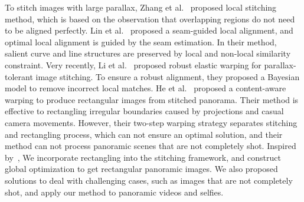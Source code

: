\documentclass[10pt,journal,compsoc]{IEEEtran}
\begin{document}
To stitch images with large parallax, Zhang et al.~\cite{conf/cvpr/ZhangL14a} proposed local stitching method, which is based on the observation that overlapping regions do not need to be aligned perfectly.
Lin et al.~\cite{conf/eccv/LinJCDL16} proposed a seam-guided local alignment, and optimal local alignment is guided by the seam estimation.
In their method, salient curve and line structures are preserved by local and non-local similarity constraint.
Very recently, Li et al.~\cite{journals/tmm/LiWLZZ18} proposed robust elastic warping for parallax-tolerant image stitching. To ensure a robust alignment, they proposed a Bayesian model to remove incorrect local matches.
He et al.~\cite{journals/tog/HeC013} proposed a content-aware warping to produce rectangular images from stitched panorama.  Their method is effective to rectangling irregular boundaries caused by projections and casual camera movements. However, their two-step warping strategy separates stitching and rectangling process, which can not ensure an optimal solution, and their method can not process panoramic scenes that are not completely shot.
Inspired by~\cite{journals/tog/HeC013}, We incorporate rectangling into the stitching framework, and construct global optimization to get rectangular panoramic images.
We also proposed solutions to deal with challenging cases, such as images that are not completely shot, and apply our method to panoramic videos and selfies.
\end{document}
